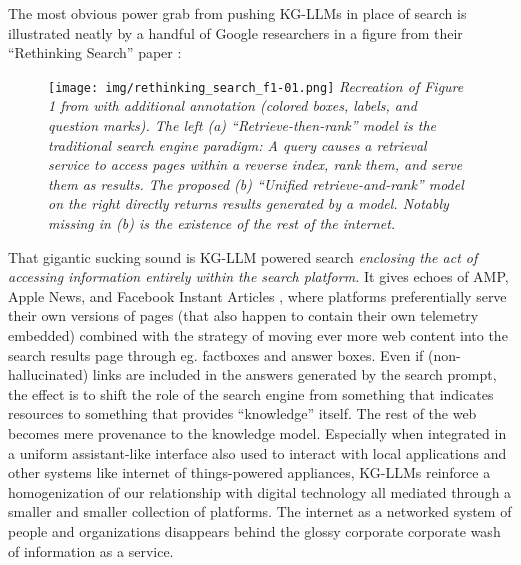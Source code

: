 The most obvious power grab from pushing KG-LLMs in place of search is
illustrated neatly by a handful of Google researchers in a figure from
their ``Rethinking Search'' paper \cite{metzlerRethinkingSearchMaking2021} :

\begin{figure}
\texttt{[image: img/rethinking\_search\_f1-01.png]}
\emph{Recreation of Figure 1 from \cite{metzlerRethinkingSearchMaking2021}  with additional annotation
(colored boxes, labels, and question marks). The left (a)
``Retrieve-then-rank'' model is the traditional search engine paradigm:
A query causes a retrieval service to access pages within a reverse
index, rank them, and serve them as results. The proposed (b) ``Unified
retrieve-and-rank'' model on the right directly returns results
generated by a model. Notably missing in (b) is the existence of the
rest of the internet.}
\end{figure}

That gigantic sucking sound is KG-LLM powered search \emph{enclosing the
act of accessing information entirely within the search platform.} It
gives echoes of AMP, Apple News, and Facebook Instant Articles \cite{ampletterLetterGoogleAMP2018, bohnGooglePlanMake2018} , where
platforms preferentially serve their own versions of pages (that also
happen to contain their own telemetry embedded) combined with the
strategy of moving ever more web content into the search results page
through eg. factboxes and answer boxes. Even if (non-hallucinated) links are included
in the answers generated by the search prompt, the effect is to shift
the role of the search engine from something that indicates resources to
something that provides ``knowledge'' itself. The rest of the web
becomes mere provenance to the knowledge model. Especially when
integrated in a uniform assistant-like interface also used to interact
with local applications and other systems like internet of
things-powered appliances, KG-LLMs reinforce a homogenization of our
relationship with digital technology all mediated through a smaller and
smaller collection of platforms. The internet as a networked system of
people and organizations disappears behind the glossy corporate
corporate wash of information as a service.

